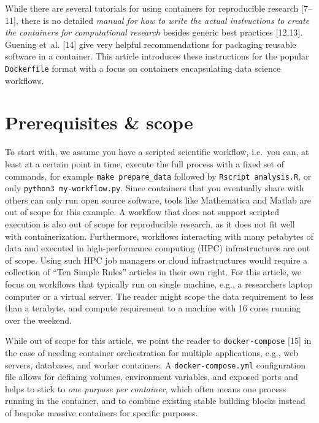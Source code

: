 \documentclass[10pt,letterpaper]{article}
\begin{document}
While there are several tutorials for using containers for reproducible
research {[}7--11{]}, there is no detailed \emph{manual for how to write
the actual instructions to create the containers for computational
research} besides generic best practices {[}12,13{]}. Guening et~al.
{[}14{]} give very helpful recommendations for packaging reusable
software in a container. This article introduces these instructions for
the popular \texttt{Dockerfile} format with a focus on containers
encapsulating data science workflows.

\hypertarget{prerequisites-scope}{%
\section{Prerequisites \& scope}\label{prerequisites-scope}}

To start with, we assume you have a scripted scientific workflow,
i.e.~you can, at least at a certain point in time, execute the full
process with a fixed set of commands, for example
\texttt{make\ prepare\_data} followed by \texttt{Rscript\ analysis.R},
or only \texttt{python3\ my-workflow.py}. Since containers that you
eventually share with others can only run open source software, tools
like Mathematica and Matlab are out of scope for this example. A
workflow that does not support scripted execution is also out of scope
for reproducible research, as it does not fit well with
containerization. Furthermore, workflows interacting with many petabytes
of data and executed in high-performance computing (HPC) infrastructures
are out of scope. Using such HPC job managers or cloud infrastructures
would require a collection of ``Ten Simple Rules'' articles in their own
right. For this article, we focus on workflows that typically run on
single machine, e.g., a researchers laptop computer or a virtual server.
The reader might scope the data requirement to less than a terabyte, and
compute requirement to a machine with 16 cores running over the weekend.

While out of scope for this article, we point the reader to
\texttt{docker-compose} {[}15{]} in the case of needing container
orchestration for multiple applications, e.g., web servers, databases,
and worker containers. A \texttt{docker-compose.yml} configuration file
allows for defining volumes, environment variables, and exposed ports
and helps to stick to \emph{one purpose per container}, which often
means one process running in the container, and to combine existing
stable building blocks instead of bespoke massive containers for
specific purposes.
\end{document}
